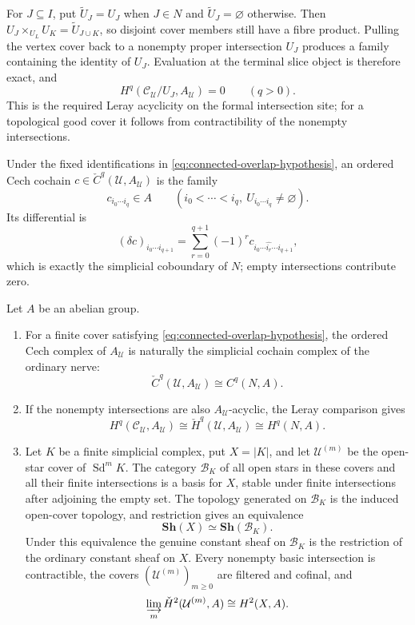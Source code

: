 For \(J\subseteq I\), put \(\widetilde U_J=U_J\) when \(J\in N\) and
\(\widetilde U_J=\varnothing\) otherwise.  Then
\(U_J\times_{U_L}U_K=\widetilde U_{J\cup K}\), so disjoint cover members
still have a fibre product.  Pulling the vertex cover back to a nonempty
proper intersection \(U_J\) produces a family containing the identity of
\(U_J\).  Evaluation at the terminal slice object is therefore exact, and
\[
 H^q(\mathcal C_{\mathcal U}/U_J,A_{\mathcal U})=0
 \qquad(q>0).
\]
This is the required Leray acyclicity on the formal intersection site; for a
topological good cover it follows from contractibility of the nonempty
intersections.

Under the fixed identifications in
\eqref{eq:connected-overlap-hypothesis}, an ordered Cech cochain
\(c\in\check C^q(\mathcal U,A_{\mathcal U})\) is the family
\[
 c_{i_0\cdots i_q}\in A
 \qquad
 (i_0<\cdots<i_q,\ U_{i_0\cdots i_q}\ne\varnothing).
\]
Its differential is
\begin{equation}\label{eq:cech-simplicial-differential}
 (\delta c)_{i_0\cdots i_{q+1}}
 =\sum_{r=0}^{q+1}(-1)^r
 c_{i_0\cdots\widehat{i_r}\cdots i_{q+1}},
\end{equation}
which is exactly the simplicial coboundary of \(N\); empty intersections
contribute zero.

\begin{proposition}
\label{prop:finite-site-comparison}
Let \(A\) be an abelian group.
\begin{enumerate}[label=(\roman*),nosep]
\item For a finite cover satisfying
      \eqref{eq:connected-overlap-hypothesis}, the ordered Cech complex of
      \(A_{\mathcal U}\) is naturally the simplicial cochain complex of the
      ordinary nerve:
      \[
      \check C^q(\mathcal U,A_{\mathcal U})
      \cong C^q(N,A).
      \]
\item If the nonempty intersections are also
      \(A_{\mathcal U}\)-acyclic, the Leray comparison gives
      \[
      H^q(\mathcal C_{\mathcal U},A_{\mathcal U})
      \cong \check H^q(\mathcal U,A_{\mathcal U})
      \cong H^q(N,A).
      \]
\item Let \(K\) be a finite simplicial complex, put \(X=|K|\), and let
      \(\mathcal U^{(m)}\) be the open-star cover of
      \(\operatorname{Sd}^mK\).  The category \(\mathcal B_K\) of all open
      stars in these covers and all their finite intersections is a basis
      for \(X\), stable under finite intersections after adjoining the empty
      set.  The topology generated on \(\mathcal B_K\) is the induced
      open-cover topology, and restriction gives an equivalence
      \[
      \mathbf {Sh}(X)\simeq\mathbf {Sh}(\mathcal B_K).
      \]
      Under this equivalence the genuine constant sheaf on
      \(\mathcal B_K\) is the restriction of the ordinary constant sheaf on
      \(X\).  Every nonempty basic intersection is contractible, the covers
      \((\mathcal U^{(m)})_{m\ge0}\) are filtered and cofinal, and
      \[
      \varinjlim_m\check H^2(\mathcal U^{(m)},A)
      \cong H^2(X,A).
      \]
\end{enumerate}
\end{proposition}

